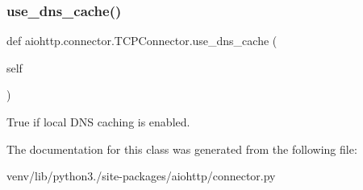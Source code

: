 \subsubsection{\texorpdfstring{use\+\_\+dns\+\_\+cache()}{use\_dns\_cache()}}
{\footnotesize\ttfamily def aiohttp.\+connector.\+T\+C\+P\+Connector.\+use\+\_\+dns\+\_\+cache (\begin{DoxyParamCaption}\item[{}]{self }\end{DoxyParamCaption})}

\begin{DoxyVerb}True if local DNS caching is enabled.\end{DoxyVerb}
 

The documentation for this class was generated from the following file\+:\begin{DoxyCompactItemize}
\item 
venv/lib/python3./site-\/packages/aiohttp/connector.\+py\end{DoxyCompactItemize}
